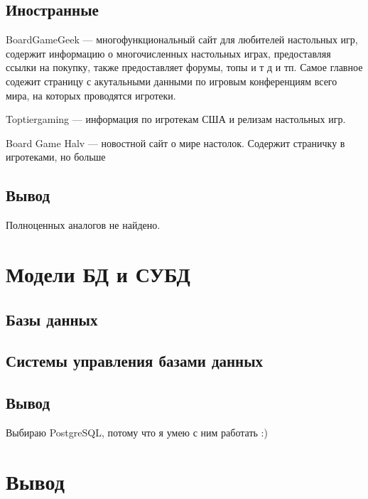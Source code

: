 \subsection{Иностранные}

BoardGameGeek --- многофункциональный сайт для любителей настольных игр,
содержит информацию о многочисленных настольных играх, предоставляя ссылки на
покупку, также предоставляет форумы, топы и т д и тп. Самое главное содежит
страницу с акутальными данными по игровым конференциям всего мира, на которых
проводятся игротеки.

Toptiergaming --- информация по игротекам США и релизам настольных игр.

Board Game Halv --- новостной сайт о мире настолок. Содержит страничку в
игротеками, но больше

\subsection{Вывод}

Полноценных аналогов не найдено.

\section{Модели БД и СУБД}

\subsection{Базы данных}

\subsection{Системы управления базами данных}

\subsection{Вывод}

Выбираю PostgreSQL, потому что я умею с ним работать :)

\section{Вывод}
